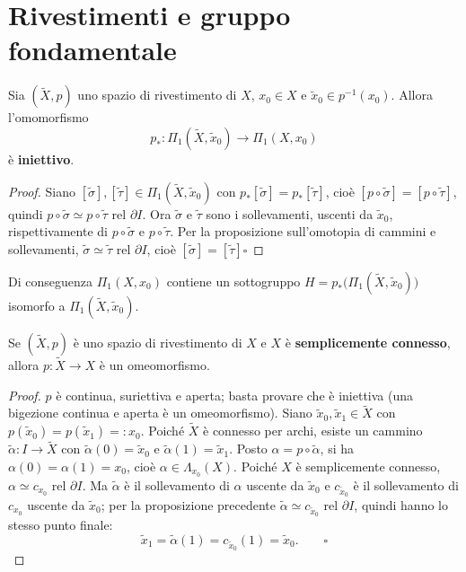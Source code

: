 \section{Rivestimenti e gruppo fondamentale}

\begin{coro}
Sia $(\widetilde{X}, p)$ uno spazio di rivestimento di $X$, $x_0 \in X$ e $\widetilde{x}_0 \in p^{-1}(x_0)$. Allora l'omomorfismo
\[
p_*: \Pi_1(\widetilde{X}, \widetilde{x}_0) \longrightarrow \Pi_1(X, x_0)
\]
\`e \textbf{iniettivo}.
\end{coro}

\begin{proof}
Siano $[\widetilde{\sigma}], [\widetilde{\tau}] \in \Pi_1(\widetilde{X}, \widetilde{x}_0)$ con $p_*[\widetilde{\sigma}] = p_*[\widetilde{\tau}]$, cio\`e $[p \circ \widetilde{\sigma}] = [p \circ \widetilde{\tau}]$, quindi $p \circ \widetilde{\sigma} \simeq p \circ \widetilde{\tau}$ rel $\partial I$. Ora $\widetilde{\sigma}$ e $\widetilde{\tau}$ sono i sollevamenti, uscenti da $\widetilde{x}_0$, rispettivamente di $p \circ \widetilde{\sigma}$ e $p \circ \widetilde{\tau}$. Per la proposizione sull'omotopia di cammini e sollevamenti, $\widetilde{\sigma} \simeq \widetilde{\tau}$ rel $\partial I$, cio\`e $[\widetilde{\sigma}] = [\widetilde{\tau}]$\hfill$\square$
\end{proof}

\begin{observacion}
Di conseguenza $\Pi_1(X, x_0)$ contiene un sottogruppo $H = p_*\big(\Pi_1(\widetilde{X}, \widetilde{x}_0)\big)$ isomorfo a $\Pi_1(\widetilde{X}, \widetilde{x}_0)$.
\end{observacion}

\begin{prop}
Se $(\widetilde{X}, p)$ \`e uno spazio di rivestimento di $X$ e $X$ \`e \textbf{semplicemente connesso}, allora $p: \widetilde{X} \to X$ \`e un omeomorfismo.
\end{prop}

\begin{proof}
$p$ \`e continua, suriettiva e aperta; basta provare che \`e iniettiva (una bigezione continua e aperta \`e un omeomorfismo). Siano $\widetilde{x}_0, \widetilde{x}_1 \in \widetilde{X}$ con $p(\widetilde{x}_0) = p(\widetilde{x}_1) =: x_0$. Poich\'e $\widetilde{X}$ \`e connesso per archi, esiste un cammino $\widetilde{\alpha}: I \to \widetilde{X}$ con $\widetilde{\alpha}(0) = \widetilde{x}_0$ e $\widetilde{\alpha}(1) = \widetilde{x}_1$. Posto $\alpha = p \circ \widetilde{\alpha}$, si ha $\alpha(0) = \alpha(1) = x_0$, cio\`e $\alpha \in \Lambda_{x_0}(X)$. Poich\'e $X$ \`e semplicemente connesso, $\alpha \simeq c_{x_0}$ rel $\partial I$. Ma $\widetilde{\alpha}$ \`e il sollevamento di $\alpha$ uscente da $\widetilde{x}_0$ e $c_{\widetilde{x}_0}$ \`e il sollevamento di $c_{x_0}$ uscente da $\widetilde{x}_0$; per la proposizione precedente $\widetilde{\alpha} \simeq c_{\widetilde{x}_0}$ rel $\partial I$, quindi hanno lo stesso punto finale:
\[
\widetilde{x}_1 = \widetilde{\alpha}(1) = c_{\widetilde{x}_0}(1) = \widetilde{x}_0 . \qquad \square
\]
\end{proof}

